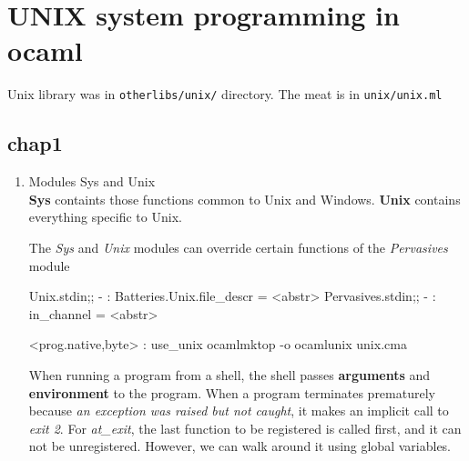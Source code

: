 \section{UNIX system programming in ocaml}
\label{sec:unix-syst-progr}


Unix library was in \verb|otherlibs/unix/| directory.
The meat is in \verb|unix/unix.ml|

\subsection{chap1}
\label{sec:chap1}

\begin{enumerate}
\item Modules Sys and Unix \\
  \textbf{Sys} containts those functions common to Unix and Windows.
  \textbf{Unix} contains everything specific to Unix.

  The \textit{Sys} and \textit{Unix} modules can override certain
  functions of the \textit{Pervasives} module
  \begin{alternate}
Unix.stdin;;
- : Batteries.Unix.file_descr = <abstr>
Pervasives.stdin;;
- : in_channel = <abstr>
\end{alternate}

\begin{ocamlcode}
  <prog.{native,byte}> : use_unix
  ocamlmktop -o ocamlunix unix.cma
\end{ocamlcode}

When running a program from a shell, the shell passes \textbf{arguments} and
\textbf{environment} to the program. When a program terminates
prematurely because \textit{an exception was raised but not caught}, it makes
an implicit call to \textit{exit 2}. For \textit{at\_exit}, the last
function to be registered is called first, and it can not be
unregistered. However, we can walk around it using global variables.


\end{enumerate}
